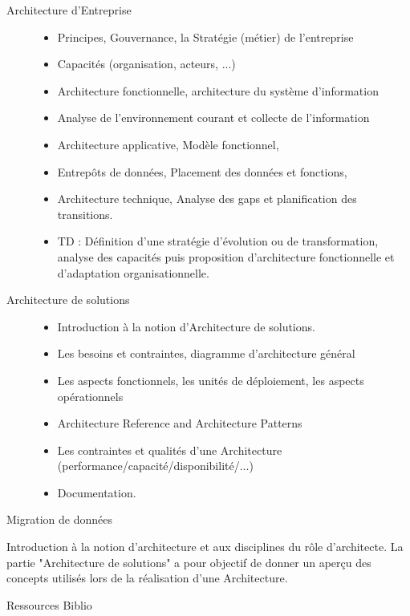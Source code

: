 \vfill

{
\begin{description}
\item[Architecture d'Entreprise]
\begin{itemize}
\item Principes, Gouvernance, la Stratégie (métier) de l'entreprise
\item Capacités (organisation, acteurs, ...)
\item Architecture fonctionnelle, architecture du système d'information
\item Analyse de l'environnement courant et collecte de l'information
\item Architecture applicative, Modèle fonctionnel,
\item Entrepôts de données, Placement des données et fonctions,
\item Architecture technique, Analyse des gaps et planification des transitions.
\item TD : Définition d'une stratégie d'évolution ou de transformation, analyse
des capacités puis proposition d'architecture fonctionnelle et
d'adaptation organisationnelle.
\end{itemize}
\item[Architecture de solutions]
\begin{itemize}
\item Introduction à la notion d'Architecture de solutions.
\item Les besoins et contraintes, diagramme d'architecture général
\item Les aspects fonctionnels, les unités de déploiement, les aspects
opérationnels
\item Architecture Reference and Architecture Patterns
\item Les contraintes et qualités d'une Architecture (performance/capacité/disponibilité/...)
\item Documentation.
\end{itemize}
\item[Migration de données]
\end{description}
}
{} 
{\begin{itemize} 
  \ObjItem Introduction à la notion d'architecture et aux disciplines du rôle
d'architecte.
\ObjItem La partie "Architecture de solutions" a pour objectif de
donner un aperçu des concepts utilisés lors de la réalisation d'une
Architecture.
\end{itemize} 
} 
{Ressources} 
{Biblio} 
 
